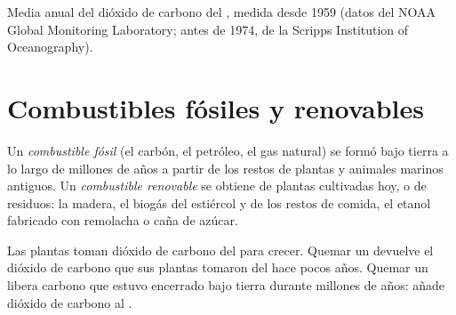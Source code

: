 \begin{omfigure}

{\small Media anual del dióxido de carbono del , medida desde 1959
(datos del NOAA Global Monitoring Laboratory; antes de 1974, de la
Scripps Institution of Oceanography).}
\end{omfigure}

\section{Combustibles fósiles y renovables}

\begin{definition}\label{def:g8:combustion-and-fuels:fossil}
Un \emph{combustible fósil} (el carbón, el
petróleo, el gas natural) se formó bajo tierra a lo largo de millones de
años a partir de los restos de plantas y animales marinos antiguos. Un
\emph{combustible renovable} se obtiene de
plantas cultivadas hoy, o de residuos: la madera, el biogás del
estiércol y de los restos de comida, el etanol fabricado con remolacha
o caña de azúcar.
\end{definition}

\begin{proposition}\label{prop:g8:combustion-and-fuels:cycle}
Las plantas toman dióxido de carbono del  para crecer. Quemar un
 devuelve el dióxido de carbono que sus plantas
tomaron del  hace pocos años. Quemar un  libera
carbono que estuvo encerrado bajo tierra durante millones de años: añade
dióxido de carbono al .
\end{proposition}

